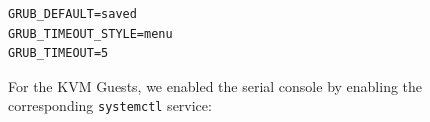 \begin{Verbatim}[breaklines=true,breakanywhere=true]
GRUB_DEFAULT=saved
GRUB_TIMEOUT_STYLE=menu
GRUB_TIMEOUT=5
\end{Verbatim}

For the KVM Guests, we enabled the serial console by enabling the
corresponding \texttt{systemctl} service:

\begin{Shaded}
\begin{Highlighting}[]
\end{Highlighting}
\end{Shaded}
